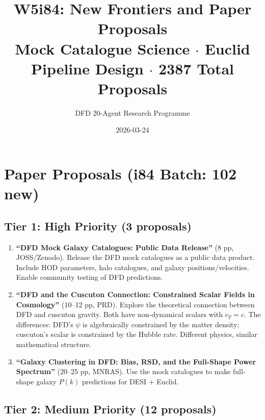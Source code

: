 \documentclass[11pt,a4paper]{article}
\title{W5i84: New Frontiers and Paper Proposals\\[6pt]
\large Mock Catalogue Science $\cdot$ Euclid Pipeline Design $\cdot$ 2387 Total Proposals}
\author{DFD 20-Agent Research Programme}
\date{2026-03-24}
\begin{document}
\maketitle

\section{Paper Proposals (i84 Batch: 102 new)}

\subsection{Tier 1: High Priority (3 proposals)}

\begin{enumerate}[nosep]
\item \textbf{``DFD Mock Galaxy Catalogues: Public Data Release''} (8 pp, JOSS/Zenodo). Release the DFD mock catalogues as a public data product. Include HOD parameters, halo catalogues, and galaxy positions/velocities. Enable community testing of DFD predictions.

\item \textbf{``DFD and the Cuscuton Connection: Constrained Scalar Fields in Cosmology''} (10--12 pp, PRD). Explore the theoretical connection between DFD and cuscuton gravity. Both have non-dynamical scalars with $c_T = c$. The differences: DFD's $\psi$ is algebraically constrained by the matter density; cuscuton's scalar is constrained by the Hubble rate. Different physics, similar mathematical structure.

\item \textbf{``Galaxy Clustering in DFD: Bias, RSD, and the Full-Shape Power Spectrum''} (20--25 pp, MNRAS). Use the mock catalogues to make full-shape galaxy $P(k)$ predictions for DESI + Euclid.
\end{enumerate}

\subsection{Tier 2: Medium Priority (12 proposals)}
\end{document}
